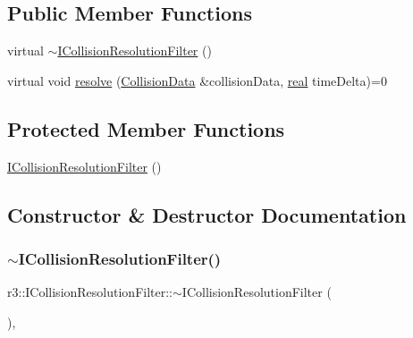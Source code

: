 \subsection*{Public Member Functions}
\begin{DoxyCompactItemize}
\item 
virtual \mbox{\hyperlink{classr3_1_1_i_collision_resolution_filter_a89b3382d573308a790d436b9713b02ed}{$\sim$\+I\+Collision\+Resolution\+Filter}} ()
\item 
virtual void \mbox{\hyperlink{classr3_1_1_i_collision_resolution_filter_a87ef2579e2acaaadef4cd8f9a20005ce}{resolve}} (\mbox{\hyperlink{classr3_1_1_collision_data}{Collision\+Data}} \&collision\+Data, \mbox{\hyperlink{namespacer3_ab2016b3e3f743fb735afce242f0dc1eb}{real}} time\+Delta)=0
\end{DoxyCompactItemize}
\subsection*{Protected Member Functions}
\begin{DoxyCompactItemize}
\item 
\mbox{\hyperlink{classr3_1_1_i_collision_resolution_filter_ab2dcf60620e28db288abf19bdeeb11ad}{I\+Collision\+Resolution\+Filter}} ()
\end{DoxyCompactItemize}


\subsection{Constructor \& Destructor Documentation}
\mbox{\label{classr3_1_1_i_collision_resolution_filter_a89b3382d573308a790d436b9713b02ed}} 
\subsubsection{\texorpdfstring{$\sim$\+I\+Collision\+Resolution\+Filter()}{~ICollisionResolutionFilter()}}
{\footnotesize\ttfamily r3\+::\+I\+Collision\+Resolution\+Filter\+::$\sim$\+I\+Collision\+Resolution\+Filter (\begin{DoxyParamCaption}{ }\end{DoxyParamCaption})\hspace{0.3cm}{\ttfamily [virtual]}, {\ttfamily [default]}}

